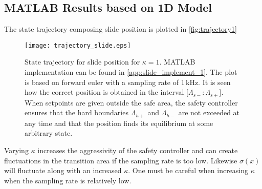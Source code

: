 \subsection{MATLAB Results based on 1D Model}
The state trajectory composing slide position is plotted in \autoref{fig:trajectory1}
\begin{figure}[H]
	\center
		\texttt{[image: trajectory\_slide.eps]}
	\caption{State trajectory for slide position for $\kappa=1$. MATLAB implementation can be found in \autoref{app:slide_implement_1}. The plot is based on forward euler with a sampling rate of $1\,$kHz. It is seen how the correct position is obtained in the interval $[\Lambda_{s-}:\Lambda_{s+}$]. When setpoints are given outside the safe area, the safety controller ensures that the hard boundaries $\Lambda_{h+}$ and $\Lambda_{h-}$ are not exceeded at any time and that the position finds its equilibrium at some arbitrary state.}
	\label{fig:trajectory1}
\end{figure}
Varying $\kappa$ increases the aggressivity of the safety controller and can create fluctuations in the transition area if the sampling rate is too low. Likewise $\sigma(x)$ will fluctuate along with an increased $\kappa$. One must be careful when increasing $\kappa$ when the sampling rate is relatively low. %

